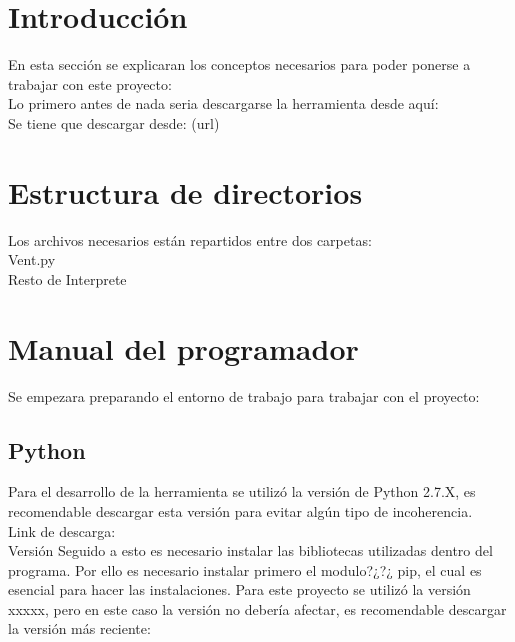 


\section{Introducción}
En esta sección se explicaran los conceptos necesarios para poder ponerse a trabajar con este proyecto:\\

Lo primero antes de nada seria descargarse la herramienta desde aquí:\\

Se tiene que descargar desde: (url)\\



\section{Estructura de directorios}
Los archivos necesarios están repartidos entre dos carpetas:\\

Vent.py\\
Resto de Interprete\\

\section{Manual del programador}
Se empezara preparando el entorno de trabajo para trabajar con el proyecto:\\

\subsection{Python}
Para el desarrollo de la herramienta se utilizó la versión de Python 2.7.X, es recomendable descargar esta versión para evitar algún tipo de incoherencia.\\

Link de descarga:\\

Versión 
Seguido a esto es necesario instalar las bibliotecas utilizadas dentro del programa. Por ello es necesario instalar primero el modulo?¿?¿ pip, el cual es esencial para hacer las instalaciones.
Para este proyecto se utilizó la versión xxxxx, pero en este caso la versión no debería afectar, es recomendable descargar la versión más reciente:\\

